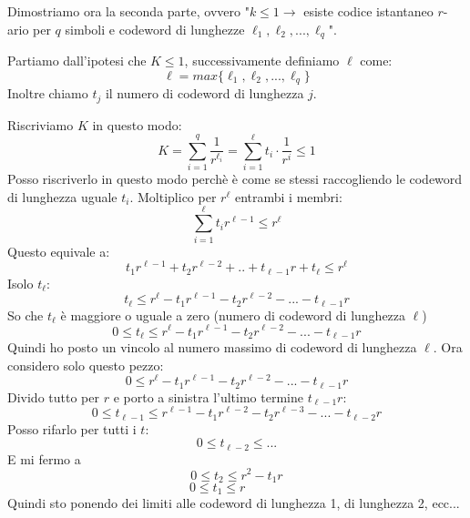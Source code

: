 \begin{dimostrazione}
\newpage

Dimostriamo ora la seconda parte, ovvero "$k\leq 1 \rightarrow$ esiste codice istantaneo $r$-ario per $q$ simboli e codeword di lunghezze $\ell_1,\ell_2,...,\ell_q$".

Partiamo dall'ipotesi che $K \leq 1$, successivamente definiamo $\ell$ come:
\begin{equation*}
\ell = max\{\ell_1, \ell_2,...,\ell_q\}
\end{equation*}
Inoltre chiamo $t_j$ il numero di codeword di lunghezza $j$.

Riscriviamo $K$ in questo modo:
\begin{equation*}
K = \sum_{i=1}^{q}\frac{1}{r^{\ell_i}} = \sum_{i=1}^{\ell}t_i\cdot\frac{1}{r^i}
\leq 1
\end{equation*}
Posso riscriverlo in questo modo perchè è come se stessi raccogliendo le codeword di lunghezza uguale $t_i$.
Moltiplico per $r^\ell$ entrambi i membri:
\begin{equation*}
\sum_{i=1}^{\ell}t_ir^{\ell-1} \leq r^\ell
\end{equation*}
Questo equivale a:
\begin{equation*}
	t_1r^{\ell-1}+t_2r^{\ell-2}+..+t_{\ell-1}r+t_\ell \leq r^\ell
\end{equation*}
Isolo $t_\ell$:
\begin{equation*}
t_\ell \leq r^{\ell} -t_1r^{\ell-1}-t_2r^{\ell-2}-...-t_{\ell-1}r
\end{equation*}
So che $t_\ell$ è maggiore o uguale a zero (numero di codeword di lunghezza $\ell$)
\begin{equation*}
0 \leq t_\ell \leq r^{\ell} -t_1r^{\ell-1}-t_2r^{\ell-2}-...-t_{\ell-1}r
\end{equation*}
Quindi ho posto un vincolo al numero massimo di codeword di lunghezza $\ell$. Ora considero solo questo pezzo:
\begin{equation*}
0 \leq r^{\ell} -t_1r^{\ell-1}-t_2r^{\ell-2}-...-t_{\ell-1}r
\end{equation*}
Divido tutto per $r$ e porto a sinistra l'ultimo termine $t_{\ell-1}r$:
\begin{equation*}
0 \leq t_{\ell-1} \leq r^{\ell-1} - t_1r^{\ell-2}-t_2r^{\ell-3}-...-t_{\ell-2}r
\end{equation*}
Posso rifarlo per tutti i $t$:
\begin{equation*}
0 \leq t_{\ell-2} \leq ...
\end{equation*}
E mi fermo a 
\begin{equation}
0 \leq t_2 \leq r^2-t_1r
\end{equation}
\begin{equation}
0 \leq t_1 \leq r \; \; \; \; \; \; \; \; \; \; \;
\end{equation}
Quindi sto ponendo dei limiti alle codeword di lunghezza 1, di lunghezza 2, ecc...


\end{dimostrazione}
